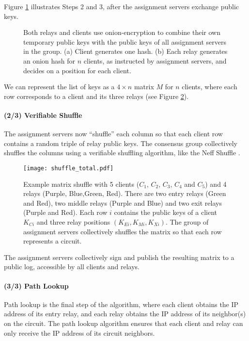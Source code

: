 Figure \ref{figure:transfer} illustrates Steps 2 and 3, after the assignment
servers exchange public keys.

\begin{figure}[htbp]
  \centering
  
  \caption{Both relays and clients use onion-encryption to combine their own
  temporary public keys with the public keys of all assignment servers in the group. (a) Client generates one hash. (b) Each relay generates an onion hash for $n$ clients, as instructed by assignment servers, and decides on a position
  for each client.}
  \label{figure:transfer}
\end{figure}

We can represent the list of keys as a $4 \times n$ matrix $M$ for $n$
clients, where each row corresponds to a client and its three relays (see
Figure \ref{figure:shuffle}).

\paragraph{(2/3) Verifiable Shuffle} The assignment servers now ``shuffle''
each column so that each client row contains a random triple of relay public
keys. The consensus group collectively shuffles the columns using a verifiable
shuffling algorithm, like the Neff Shuffle \cite{neff2001verifiable}.


\begin{figure}
  \centering
    \texttt{[image: shuffle\_total.pdf]}
  \caption{Example matrix shuffle with 5 clients ($C_1$, $C_2$, $C_3$, $C_4$ and $C_5$) and 4
relays (Purple, Blue,Green, Red). There are two entry relays (Green and Red),
two middle relays (Purple and Blue) and two exit relays (Purple and Red). Each
row $i$ contains the public keys of a client $K_{Ci}$ and three relay positions
$(K_{Ei}, K_{Mi}, K_{Xi})$. The group of assignment servers collectively shuffles
the matrix so that each row represents a circuit.}
  \label{figure:shuffle}
\end{figure}


The assignment servers collectively sign and publish the resulting matrix to a
public log, accessible by all clients and relays.

\paragraph{(3/3) Path Lookup}
Path lookup is the final step of the algorithm, where each client obtains the
IP address of its entry relay, and each relay obtains the IP address of its
neighbor(s) on the circuit. The path lookup algorithm ensures that each client
and relay can only receive the IP address of its circuit neighbors.

